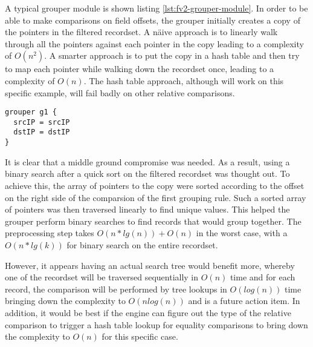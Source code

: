 A typical grouper module is shown listing \ref{lst:fv2-grouper-module}. In
order to be able to make comparisons on field offsets, the grouper initially
creates a copy of the pointers in the filtered recordset. A n\"aive approach
is to linearly walk through  all the
pointers against each pointer in the copy leading to a complexity of $O(n^2)$.
A smarter approach is to put the copy in a hash table and then try to map each
pointer while walking down the recordset once, leading to a complexity of
$O(n)$. The hash table approach, although will work on this specific example,
will fail badly on other relative comparisons.

\begin{lstlisting}
grouper g1 {
  srcIP = srcIP
  dstIP = dstIP
}
\end{lstlisting}

It is clear that a middle ground compromise was needed. As a result, using a
binary search after a quick sort on the filtered recordset was thought out. To
achieve this, the array of pointers to the copy were sorted according to the
offset  on the right side of the
comparsion of the first grouping rule. Such a sorted array of pointers was
then traversed linearly to find unique values.  This helped the grouper
perform binary searches to find records that would group together. The
preprocessing step takes $O(n*lg(n)) + O(n)$ in the worst case, with a
$O(n*lg(k))$ for binary search on the entire recordset.

However, it appears having an actual search tree would benefit more, whereby
one of the recordset will be traversed sequentially in $O(n)$ time and for
each record, the comparison will be performed by tree  lookups in $O(log(n))$ time bringing down the
complexity to $O(nlog(n))$ and is a future action item. In addition, it would
be best if the engine can figure out the type of the relative comparison to
trigger a hash table lookup for equality comparisons to bring down the
complexity to $O(n)$ for this specific case.

